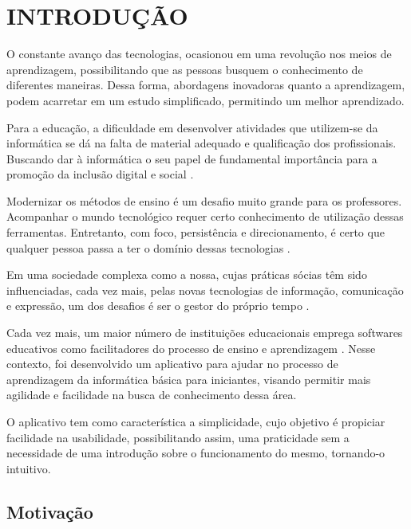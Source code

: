 
\chapter{INTRODUÇÃO}
\label{chap:introducao}

O constante avanço das tecnologias, ocasionou em uma revolução nos meios de aprendizagem, possibilitando que as pessoas busquem o conhecimento de diferentes maneiras. Dessa forma, abordagens inovadoras quanto a aprendizagem, podem acarretar em um estudo simplificado, permitindo um melhor aprendizado.

Para a educação, a dificuldade em desenvolver atividades que utilizem-se da informática se dá na falta de material adequado e qualificação dos profissionais. Buscando dar à informática o seu papel de fundamental importância para a promoção da inclusão digital e social \cite{edinaaparecidateixeira2017}.

Modernizar os métodos de ensino é um desafio muito grande para os professores. Acompanhar o mundo tecnológico requer certo conhecimento de utilização dessas ferramentas. Entretanto, com foco, persistência e direcionamento, é certo que qualquer pessoa passa a ter o domínio dessas tecnologias \cite{de2017informatica}.

Em uma sociedade complexa como a nossa, cujas práticas sócias têm sido influenciadas, cada vez mais, pelas novas tecnologias de informação, comunicação e expressão, um dos desafios é ser o gestor do próprio tempo \cite{silva2019crianccas}.

Cada vez mais, um maior número de instituições educacionais emprega softwares educativos como facilitadores do processo de ensino e aprendizagem \cite{da2006design}. Nesse contexto, foi desenvolvido um aplicativo para ajudar no processo de aprendizagem da informática básica para iniciantes, visando permitir mais agilidade e facilidade na busca de conhecimento dessa área.

O aplicativo tem como característica a simplicidade, cujo objetivo é propiciar facilidade na usabilidade, possibilitando assim, uma praticidade sem a necessidade de uma introdução sobre o funcionamento do mesmo, tornando-o intuitivo.


\section{Motivação}
\label{sec:motivacao}

